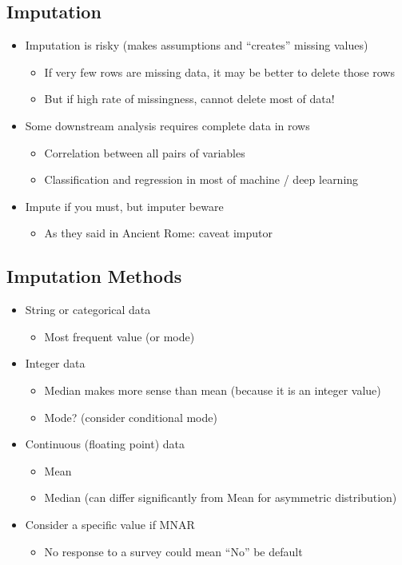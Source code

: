 \documentclass[11pt]{article}
\theoremstyle{definition}
\begin{document}
\subsection{Imputation}
\begin{itemize}
    \item Imputation is risky (makes assumptions and “creates” missing values)
    \begin{itemize}
        \item If very few rows are missing data, it may be better to delete those rows
        \item But if high rate of missingness, cannot delete most of data!
    \end{itemize}
    \item Some downstream analysis requires complete data in rows
    \begin{itemize}
        \item Correlation between all pairs of variables
        \item Classification and regression in most of machine / deep learning
    \end{itemize}
    \item Impute if you must, but imputer beware
    \begin{itemize}
        \item As they said in Ancient Rome: caveat imputor
    \end{itemize}
\end{itemize}
\subsection{Imputation Methods}
\begin{itemize}
    \item String or categorical data
    \begin{itemize}
        \item Most frequent value (or mode)
    \end{itemize}
    \item Integer data
    \begin{itemize}
        \item Median makes more sense than mean (because it is an integer value)
        \item Mode? (consider conditional mode)
    \end{itemize}
    \item Continuous (floating point) data
    \begin{itemize}
        \item Mean
        \item Median (can differ significantly from Mean for asymmetric distribution)
    \end{itemize}
    \item Consider a specific value if MNAR
    \begin{itemize}
        \item No response to a survey could mean “No” be default
    \end{itemize}
\end{itemize}
\end{document}
